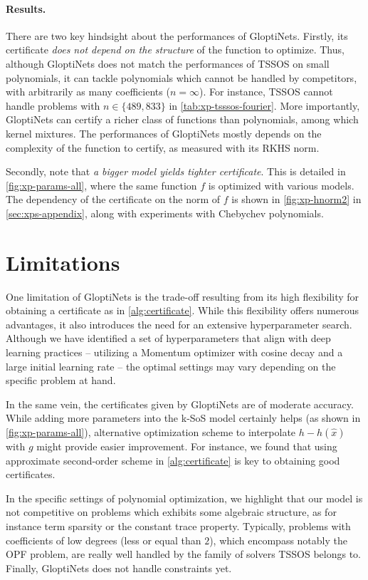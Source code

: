 \documentclass{article}
\begin{document}
\paragraph{Results.}
There are two key hindsight about the performances of GloptiNets.
Firstly, its certificate \emph{does not depend on the structure} of the function to optimize.
Thus, although GloptiNets does not match the performances of TSSOS on small polynomials, it can tackle polynomials which cannot be handled by competitors, with arbitrarily as many coefficients ($n = \infty$). For instance, TSSOS cannot handle problems with $n \in \{489, 833\}$ in \cref{tab:xp-tsssos-fourier}.
More importantly, GloptiNets can certify a richer class of functions than polynomials, among which kernel mixtures. The performances of GloptiNets mostly depends on the complexity of the function to certify, as measured with its RKHS norm.

Secondly, note that \emph{a bigger model yields tighter certificate}. This is detailed in \cref{fig:xp-params-all}, where the same function $f$ is optimized with various models. The dependency of the certificate on the norm of $f$ is shown in \cref{fig:xp-hnorm2} in \cref{sec:xps-appendix}, along with experiments with Chebychev polynomials.


\section{Limitations}

One limitation of GloptiNets is the trade-off resulting from its high flexibility for obtaining a certificate as in \cref{alg:certificate}. While this flexibility offers numerous advantages, it also introduces the need for an extensive hyperparameter search. Although we have identified a set of hyperparameters that align with deep learning practices -- utilizing a Momentum optimizer with cosine decay and a large initial learning rate -- the optimal settings may vary depending on the specific problem at hand.

In the same vein, the certificates given by GloptiNets are of moderate accuracy. While adding more parameters into the k-SoS model certainly helps (as shown in \cref{fig:xp-params-all}), alternative optimization scheme to interpolate $h - h(\hat{x})$ with $g$ might provide easier improvement. For instance, we found that using approximate second-order scheme in \cref{alg:certificate} is key to obtaining good certificates.

In the specific settings of polynomial optimization, we highlight that our model is not competitive on problems which exhibits some algebraic structure, as for instance term sparsity or the constant trace property. Typically, problems with coefficients of low degrees (less or equal than $2$), which encompass notably the OPF problem, are really well handled by the family of solvers TSSOS belongs to. Finally, GloptiNets does not handle constraints yet.
\end{document}
